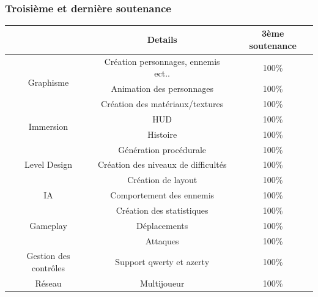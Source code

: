 \documentclass[12pt,a4paper]{article}
\begin{document}
\vspace*{\fill}
\\
\newpage
\vspace*{1mm}
\normalsize{\subsubsection{Troisième et dernière soutenance}}
\vspace{1cm}
\begin{tabular}{|c|c|c|}
\hline
                              & Details                              & 3ème soutenance \\ \hline
\multirow{3}{*}{Graphisme}    & Création  personnages, ennemis ect.. & 100\%           \\ \cline{2-3} 
                              & Animation des personnages            & 100\%           \\ \cline{2-3} 
                              & Création des matériaux/textures      & 100\%           \\ \hline
\multirow{2}{*}{Immersion}    & HUD                                  & 100\%           \\ \cline{2-3} 
                              & Histoire                             & 100\%           \\ \hline
\multirow{3}{*}{Level Design} & Génération procédurale               & 100\%           \\ \cline{2-3} 
                              & Création des niveaux de difficultés  & 100\%           \\ \cline{2-3} 
                              & Création de layout                   & 100\%           \\ \hline
IA                            & Comportement des ennemis             & 100\%           \\ \hline
\multirow{3}{*}{Gameplay}     & Création des statistiques            & 100\%           \\ \cline{2-3} 
                              & Déplacements                         & 100\%           \\ \cline{2-3} 
                              & Attaques                             & 100\%           \\ \hline
Gestion des contrôles         & Support qwerty et azerty             & 100\%           \\ \hline
Réseau                        & Multijoueur                          & 100\%           \\ \hline
\end{tabular}
\newpage
\vspace*{1mm} 
\end{document}

